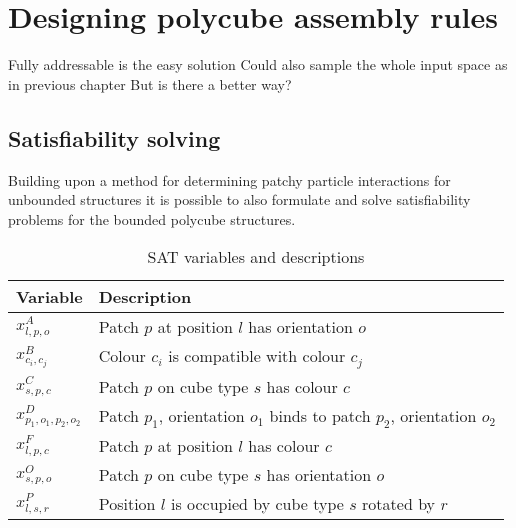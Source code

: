 \chapter{Designing polycube assembly rules}

Fully addressable is the easy solution
Could also sample the whole input space as in previous chapter
But is there a better way?

\minitoc

\section{Satisfiability solving}

Building upon a method for determining patchy particle interactions for unbounded structures \cite{romano2020designing} it is possible to also formulate and solve satisfiability problems for the bounded polycube structures.

\begin{table}[h!]
\centering
\begin{tabular}{l|l} 
 \hline
 Variable & Description \\ [0.5ex] 
 \hline
 \hline
 
\(x_{l,p,o}^{A}\) & Patch \(p\) at position \(l\) has orientation \(o\) \\
\(x_{c_i,c_j}^{B}\) &  Colour \(c_i\) is compatible with colour \(c_j\) \\
\(x_{s,p,c}^{C}\) & Patch \(p\) on cube type \(s\) has colour \(c\) \\
\(x_{p_1,o_1,p_2,o_2}^{D}\) & Patch \(p_1\), orientation \(o_1\) binds to patch \(p_2\), orientation \(o_2\) \\
\(x_{l,p,c}^{F}\) & Patch \(p\) at position \(l\) has colour \(c\) \\
\(x_{s,p,o}^{O}\) & Patch \(p\) on cube type \(s\) has orientation \(o\) \\
\(x_{l,s,r}^{P}\) & Position \(l\) is occupied by cube type \(s\) rotated by \(r\) \\
 \hline
\end{tabular}
\caption{SAT variables and descriptions}
\label{tab:sat_variables}
\end{table}

